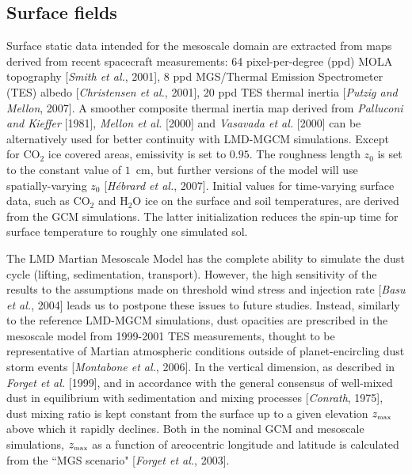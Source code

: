 \mk
\subsection{Surface fields}

\sk
Surface static data intended for the mesoscale domain are extracted from maps derived from recent spacecraft measurements: 64 pixel-per-degree (ppd) MOLA topography [\textit{Smith et al.}, 2001]\nocite{Smit:01mola}, 8 ppd MGS/Thermal Emission Spectrometer (TES) albedo [\textit{Christensen et al.}, 2001]\nocite{Chri:01}, 20 ppd TES thermal inertia [\textit{Putzig and Mellon}, 2007]\nocite{Putz:07}. A smoother composite thermal inertia map derived from \textit{Palluconi and Kieffer} [1981]\nocite{Pall:81}, \textit{Mellon et al.} [2000]\nocite{Mell:00} and \textit{Vasavada et al.} [2000]\nocite{Vasa:00} can be alternatively used for better continuity with LMD-MGCM simulations. Except for CO$_2$ ice covered areas, emissivity is set to $0.95$. The roughness length $z_0$ is set to the constant value of $1$~cm, but further versions of the model will use spatially-varying $z_0$ [\textit{H\'ebrard et al.}, 2007]\nocite{Hebr:07}. Initial values for time-varying surface data, such as CO$_2$ and H$_2$O ice on the surface and soil temperatures, are derived from the GCM simulations. The latter initialization reduces the spin-up time for surface temperature to roughly one simulated sol.

\sk
The LMD Martian Mesoscale Model has the complete ability to simulate the dust cycle (lifting, sedimentation, transport). However, the high sensitivity of the results to the assumptions made on threshold wind stress and injection rate [\textit{Basu et al.}, 2004]\nocite{Basu:04} leads us to postpone these issues to future studies. Instead, similarly to the reference LMD-MGCM simulations, dust opacities are prescribed in the mesoscale model from 1999-2001 TES measurements, thought to be representative of Martian atmospheric conditions outside of planet-encircling dust storm events [\textit{Montabone et al.}, 2006]\nocite{Mont:06luca}. In the vertical dimension, as described in \textit{Forget et al.} [1999], and in accordance with the general consensus of well-mixed dust in equilibrium with sedimentation and mixing processes [\textit{Conrath}, 1975]\nocite{Conr:75}, dust mixing ratio is kept constant from the surface up to a given elevation $z_{\textrm{\tiny{max}}}$ above which it rapidly declines. Both in the nominal GCM and mesoscale simulations, $z_{\textrm{\tiny{max}}}$ as a function of areocentric longitude and latitude is calculated from the ``MGS scenario" [\textit{Forget et al.}, 2003]\nocite{Forg:03}.

